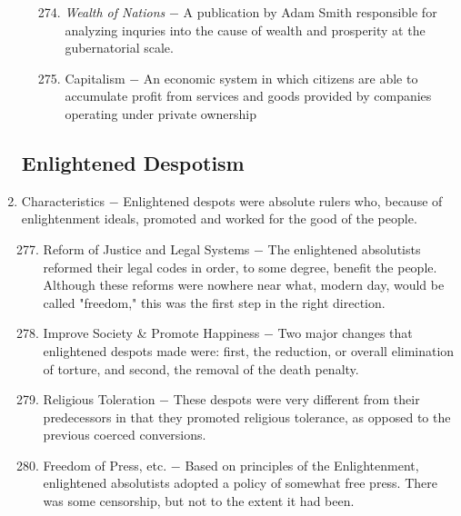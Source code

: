\documentclass[12pt]{article}
\begin{document}
\begin{enumerate}
\begin{enumerate}[label=\arabic{*}.]
\begin{enumerate}[label=\arabic{*}.]
\setcounter{enumiii}{273}

\item \textit{Wealth of Nations} $-$ A publication by Adam Smith responsible for analyzing inquries into the cause of wealth and prosperity at the gubernatorial scale.

\item Capitalism $-$ An economic system in which citizens are able to accumulate profit from services and goods provided by companies operating under private ownership

\end{enumerate}

\end{enumerate}
\setcounter{enumi}{275}

\subsection{Enlightened Despotism}

\item Characteristics $-$ Enlightened despots were absolute rulers who, because of enlightenment ideals, promoted and worked for the good of the people.

\begin{enumerate}[label=\arabic{*}.]
\setcounter{enumii}{276}

\item Reform of Justice and Legal Systems $-$ The enlightened absolutists reformed their legal codes in order, to some degree, benefit the people. Although these reforms were nowhere near what, modern day, would be called "freedom," this was the first step in the right direction.

\item Improve Society \& Promote Happiness $-$ Two major changes that enlightened despots made were: first, the reduction, or overall elimination of torture, and second, the removal of the death penalty.

\item Religious Toleration $-$ These despots were very different from their predecessors in that they promoted religious tolerance, as opposed to the previous coerced conversions.

\item Freedom of Press, etc. $-$ Based on principles of the Enlightenment, enlightened absolutists adopted a policy of somewhat free press. There was some censorship, but not to the extent it had been.


\end{enumerate}
\end{enumerate}
\end{document}
